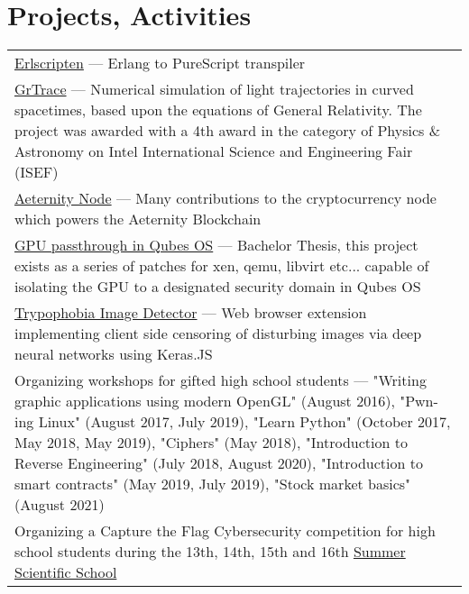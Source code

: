 
\section{\sc Projects, Activities}
\begin{tabular}{@{\llap{\textbullet{ }}~}p{5.15in}}
     \href{https://github.com/erlscripten/erlscripten}{Erlscripten} ---  Erlang to PureScript transpiler \\

     \href{https://github.com/grtrace/grtrace}{GrTrace} ---  Numerical simulation of light trajectories in curved spacetimes, based upon the equations of General Relativity. The project was awarded with a 4th award in the category of Physics \& Astronomy on Intel International Science and Engineering Fair (ISEF) \\

     \href{https://github.com/aeternity/aeternity}{Aeternity Node} --- Many contributions to the cryptocurrency node which powers the Aeternity Blockchain \\

     \href{www.qubes-os.org}{GPU passthrough in Qubes OS}  --- Bachelor Thesis, this project exists as a series of patches for xen, qemu, libvirt etc... capable of isolating the GPU to a designated security domain in Qubes OS \\

     \href{https://github.com/cytadela8/trypophobia}{Trypophobia Image Detector} --- Web browser extension implementing client side censoring of disturbing images via deep neural networks using Keras.JS \\
     
     Organizing workshops for gifted high school students --- "Writing graphic applications using modern OpenGL" (August 2016), "Pwn-ing Linux" (August 2017, July 2019), "Learn Python" (October 2017, May 2018, May 2019), "Ciphers" (May 2018), "Introduction to Reverse Engineering" (July 2018, August 2020), "Introduction to smart contracts" (May 2019, July 2019), "Stock market basics" (August 2021) \\
     
     Organizing a Capture the Flag Cybersecurity competition for high school students during the 13th, 14th, 15th and 16th \href{https://warsztatywww.pl/article/en-indie-camp-for-hs-geeks/}{Summer Scientific School}
     
\end{tabular}
\vspace{-0.3in}
